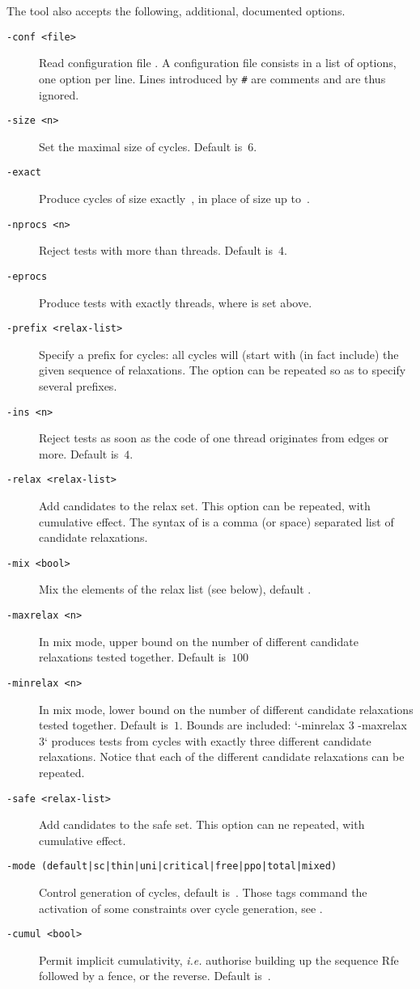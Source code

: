 The tool \diy{} also accepts the following, additional, documented options.
\begin{description}
\item[{\tt -conf <file>}] Read configuration file .
A configuration file consists in a list of options, one option per line.
Lines introduced by \verb+#+ are comments and are thus ignored.
\item[{\tt -size <n>}] Set the maximal size of cycles. Default is~$6$.
\item[{\tt -exact}] Produce cycles of size exactly~,
in place of size up to~.
\item[{\tt -nprocs <n>}] Reject tests with more than  threads.
Default is~$4$.
\item[{\tt -eprocs}] Produce tests with exactly 
threads, where  is set above.
\item[{\tt -prefix <relax-list>}] Specify a prefix for cycles: all cycles will (start with (in fact include) the given sequence of relaxations. The option can be repeated so as to specify several prefixes.
\item[{\tt -ins <n>}] Reject tests as soon as the code of one thread
originates from  edges or more. Default is~$4$.
\item[{\tt -relax <relax-list>}] Add candidates to the relax set.  This option can be repeated, with cumulative effect.
The syntax of  is a comma (or space)
separated list of candidate relaxations.
\item[{\tt -mix <bool>}] Mix the elements of the relax list
(see below), default .
\item[{\tt -maxrelax <n>}]
In mix mode, upper bound on the number of different candidate
relaxations tested together.
Default is~$100$
\item[{\tt -minrelax <n>}]
In mix mode, lower bound on the number of different candidate
relaxations tested together.
Default is~$1$. Bounds are included: `-minrelax 3 -maxrelax 3` produces tests from cycles with exactly three different candidate relaxations. Notice that each of the different candidate relaxations can be repeated.
\item[{\tt -safe <relax-list>}] Add candidates to the safe set. This option can ne repeated, with cumulative effect.
\item[{\tt -mode (default|sc|thin|uni|critical|free|ppo|total|mixed)}]
Control generation  of cycles, default is~.
Those tags command the activation of some constraints over cycle
generation, see .
\item[{\tt -cumul <bool>}]
Permit implicit cumulativity,
\emph{i.e.} authorise building up the sequence Rfe followed by a fence,
or the reverse. Default is~.
\end{description}
